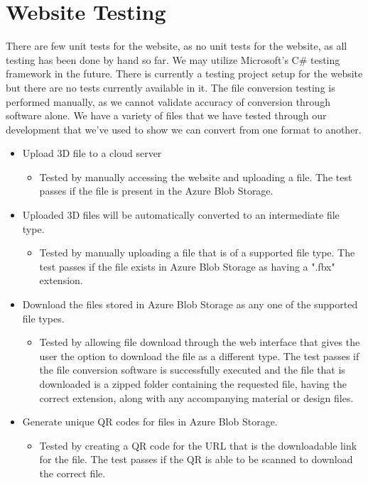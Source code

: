 
\section{Website Testing}
There are few unit tests for the website, as  no unit tests for the website, as all testing has been done by hand so far.
We may utilize Microsoft's C\# testing framework in the future. There is currently a testing project setup for the website but there are no tests currently available in it.
The file conversion testing is performed manually, as we cannot validate accuracy of conversion through software alone. We have a variety of files that we have tested through our development that we've used to show we can convert from one format to another.

\begin{itemize} 
    \item Upload 3D file to a cloud server 
    \begin{itemize}
        \item Tested by manually accessing the website and uploading a file. The test passes if the file is present in the Azure Blob Storage.
    \end{itemize}

    \item Uploaded 3D files will be automatically converted to an intermediate file type.
    \begin{itemize}
        \item Tested by manually uploading a file that is of a supported file type. The test passes if the file exists in Azure Blob Storage as having a ".fbx" extension.
    \end{itemize}    

    \item Download the files stored in Azure Blob Storage as any one of the supported file types.
    \begin{itemize}
        \item Tested by allowing file download through the web interface that gives the user the option to download the file as a different type. The test passes if the file conversion software is successfully executed and the file that is downloaded is a zipped folder containing the requested file, having the correct extension, along with any accompanying material or design files.
    \end{itemize}    

    \item Generate unique QR codes for files in Azure Blob Storage.
    \begin{itemize}
        \item Tested by creating a QR code for the URL that is the downloadable link for the file. The test passes if the QR is able to be scanned to download the correct file.
    \end{itemize}    


\end{itemize}
